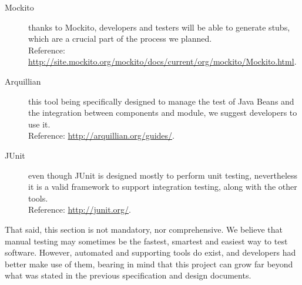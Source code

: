 \begin{description}
	
	\item[Mockito] thanks to Mockito, developers and testers will be able to generate stubs, which are a crucial part of the process we planned. \\Reference: \url{http://site.mockito.org/mockito/docs/current/org/mockito/Mockito.html}.

	\item[Arquillian] this tool being specifically designed to manage the test of Java Beans and the integration between components and module, we suggest developers to use it. \\Reference: \url{http://arquillian.org/guides/}.
		
	\item[JUnit] even though JUnit is designed mostly to perform unit testing, nevertheless it is a valid framework to support integration testing, along with the other tools. \\Reference: \url{http://junit.org/}.
	
\end{description}


That said, this section is not mandatory, nor comprehensive. We believe that manual testing may sometimes be the fastest, smartest and easiest way to test software. However, automated and supporting tools do exist, and developers had better make use of them, bearing in mind that this project can grow far beyond what was stated in the previous specification and design documents.  


























